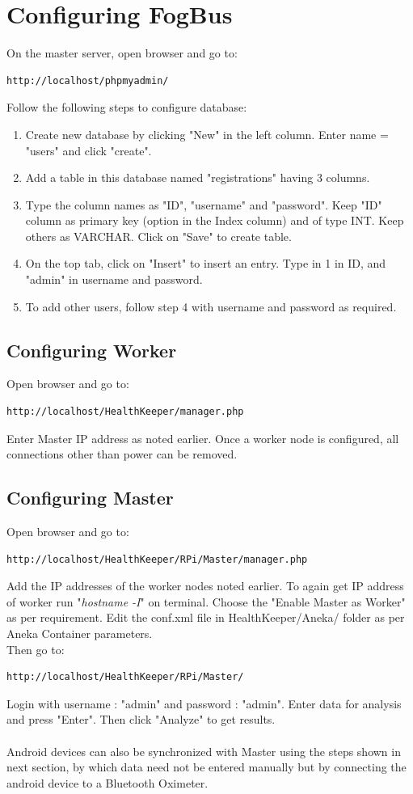 \documentclass{article}
\begin{document}
\section{Configuring FogBus}

On the master server, open browser and go to:
\begin{lstlisting}[style=BashInputStyle]
    http://localhost/phpmyadmin/
\end{lstlisting}
Follow the following steps to configure database:
\begin{enumerate}
\item Create new database by clicking "New" in the left column. Enter name = "users" and click "create".
\item Add a table in this database named "registrations" having 3 columns.
\item Type the column names as "ID", "username" and "password". Keep "ID" column as primary key (option in the Index column) and of type INT. Keep others as VARCHAR. Click on "Save" to create table.
\item On the top tab, click on "Insert" to insert an entry. Type in 1 in ID, and "admin" in username and password.
\item To add other users, follow step 4 with username and password as required.
\end{enumerate}

\subsection{Configuring Worker}
Open browser and go to:
\begin{lstlisting}[style=BashInputStyle]
    http://localhost/HealthKeeper/manager.php
\end{lstlisting}
Enter Master IP address as noted earlier. Once a worker node is configured, all connections other than power can be removed.

\subsection{Configuring Master}
Open browser and go to:
\begin{lstlisting}[style=BashInputStyle]
    http://localhost/HealthKeeper/RPi/Master/manager.php
\end{lstlisting}
Add the IP addresses of the worker nodes noted earlier. To again get IP address of worker run "\textit{hostname -I}" on terminal. Choose the "Enable Master as Worker" as per requirement. Edit the conf.xml file in HealthKeeper/Aneka/ folder as per Aneka Container parameters.
\\Then go to:
\begin{lstlisting}[style=BashInputStyle]
    http://localhost/HealthKeeper/RPi/Master/
\end{lstlisting}
Login with username : "admin" and password : "admin". Enter data for analysis and press "Enter". Then click "Analyze" to get results. \\ \\ 
Android devices can also be synchronized with Master using the steps shown in next section, by which data need not be entered manually but by connecting the android device to a Bluetooth Oximeter.
\end{document}
